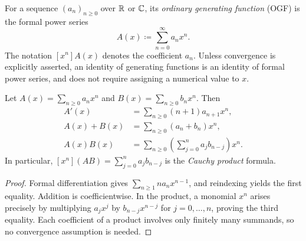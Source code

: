 \documentclass[11pt, oneside]{article}
\begin{document}
\begin{definition}
For a sequence $(a_n)_{n\ge0}$ over $\mathbb{R}$ or $\mathbb{C}$, its \emph{ordinary generating function} (OGF) is the formal power series
\[
A(x)\coloneqq\sum_{n=0}^{\infty}a_nx^n.
\]
The notation $[x^n]A(x)$ denotes the coefficient $a_n$. Unless convergence is explicitly asserted, an identity of generating functions is an identity of formal power series, and does not require assigning a numerical value to $x$.
\end{definition}
\begin{proposition}\label{prop:ogfops}
Let $A(x)=\displaystyle\sum_{n\ge0}a_nx^n$ and $B(x)=\displaystyle\sum_{n\ge0}b_nx^n$. Then
\[
\begin{aligned}
A'(x)&=\sum_{n\ge0}(n+1)a_{n+1}x^n, \\
A(x)+B(x)&=\sum_{n\ge0}(a_n+b_n)x^n, \\
A(x)B(x)&=\sum_{n\ge0}\left(\sum_{j=0}^na_jb_{n-j}\right)x^n.
\end{aligned}
\]
In particular, $[x^n](AB)=\displaystyle\sum_{j=0}^na_jb_{n-j}$ is the \emph{Cauchy product} formula.
\end{proposition}
\begin{proof}
Formal differentiation gives $\displaystyle\sum_{n\ge1}na_nx^{n-1}$, and reindexing yields the first equality. Addition is coefficientwise. In the product, a monomial $x^n$ arises precisely by multiplying $a_jx^j$ by $b_{n-j}x^{n-j}$ for $j=0, \ldots, n$, proving the third equality. Each coefficient of a product involves only finitely many summands, so no convergence assumption is needed.
\end{proof}
\end{document}
